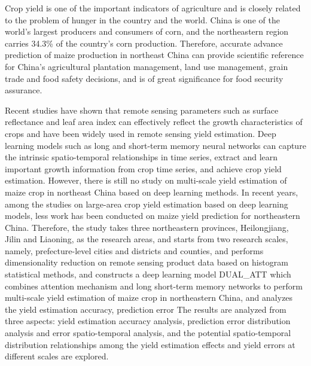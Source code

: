 \par Crop yield is one of the important indicators of agriculture and is closely related to the problem of hunger in the country and the world. China is one of the world's largest producers and consumers of corn, and the northeastern region carries 34.3\% of the country's corn production. Therefore, accurate advance prediction of maize production in northeast China can provide scientific reference for China's agricultural plantation management, land use management, grain trade and food safety decisions, and is of great significance for food security assurance.

\par Recent studies have shown that remote sensing parameters such as surface reflectance and leaf area index can effectively reflect the growth characteristics of crops and have been widely used in remote sensing yield estimation. Deep learning models such as long and short-term memory neural networks can capture the intrinsic spatio-temporal relationships in time series, extract and learn important growth information from crop time series, and achieve crop yield estimation. However, there is still no study on multi-scale yield estimation of maize crop in northeast China based on deep learning methods. In recent years, among the studies on large-area crop yield estimation based on deep learning models, less work has been conducted on maize yield prediction for northeastern China. Therefore, the study takes three northeastern provinces, Heilongjiang, Jilin and Liaoning, as the research areas, and starts from two research scales, namely, prefecture-level cities and districts and counties, and performs dimensionality reduction on remote sensing product data based on histogram statistical methods, and constructs a deep learning model DUAL\_ATT which combines attention mechanism and long short-term memory networks to perform multi-scale yield estimation of maize crop in northeastern China, and analyzes the yield estimation accuracy, prediction error The results are analyzed from three aspects: yield estimation accuracy analysis, prediction error distribution analysis and error spatio-temporal analysis, and the potential spatio-temporal distribution relationships among the yield estimation effects and yield errors at different scales are explored.

